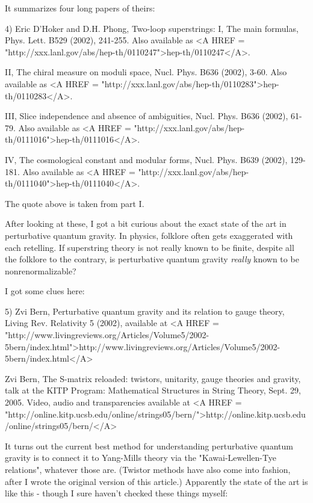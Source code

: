 It summarizes four long papers of theirs:

4) Eric D'Hoker and D.H. Phong, Two-loop superstrings: I, The main formulas, 
Phys. Lett. B529 (2002), 241-255.  Also available as <A HREF = "http://xxx.lanl.gov/abs/hep-th/0110247">hep-th/0110247</A>.  

II, The chiral measure on moduli space, Nucl. Phys. B636 (2002), 3-60.
Also available as <A HREF = "http://xxx.lanl.gov/abs/hep-th/0110283">hep-th/0110283</A>.  

III, Slice independence and absence of ambiguities, Nucl. Phys. B636 
(2002), 61-79.  Also available as <A HREF = "http://xxx.lanl.gov/abs/hep-th/0111016">hep-th/0111016</A>.  

IV, The cosmological constant and modular forms, Nucl. Phys. B639 (2002), 
129-181.  Also available as <A HREF = "http://xxx.lanl.gov/abs/hep-th/0111040">hep-th/0111040</A>.

The quote above is taken from part I.  

After looking at these, I got a bit curious about the exact state of 
the art in perturbative quantum gravity.  In physics, folklore often
gets exaggerated with each retelling.  If superstring theory is not 
really known to be finite, despite all the folklore to the
contrary, is perturbative quantum gravity \emph{really} known to be 
nonrenormalizable?   

I got some clues here:

5) Zvi Bern, Perturbative quantum gravity and its relation to gauge 
theory, Living Rev. Relativity 5 (2002), available at
<A HREF = "http://www.livingreviews.org/Articles/Volume5/2002-5bern/index.html">http://www.livingreviews.org/Articles/Volume5/2002-5bern/index.html</A>

Zvi Bern, The S-matrix reloaded: twistors, unitarity, gauge theories 
and gravity, talk at the KITP Program: Mathematical Structures in 
String Theory, Sept. 29, 2005.  Video, audio and transparencies available
at <A HREF = "http://online.kitp.ucsb.edu/online/strings05/bern/">http://online.kitp.ucsb.edu/online/strings05/bern/</A> 

It turns out the current best method for understanding perturbative 
quantum gravity is to connect it to Yang-Mills theory via the
"Kawai-Lewellen-Tye relations", whatever those are.  
(Twistor methods have also come into fashion, after I wrote the
original version of this article.)  Apparently 
the state of the art is like this - though I sure haven't checked
these things myself:

